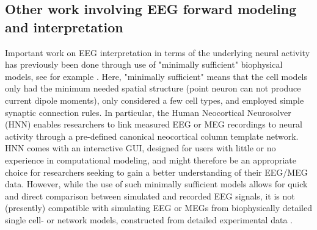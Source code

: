 \documentclass[preprint,10pt,authoryear]{elsarticle}
\newcommand{\gex}[1]{{\color{Orange}#1}}
\begin{document}

\gex{\subsection{Other work involving EEG forward modeling and interpretation}}
Important work on EEG interpretation in terms of the underlying neural activity has previously been done through use of "minimally sufficient" biophysical models, see for example \cite{Murakami2002, Murakami2003, Jones2007, Jones2009, Sliva2018, NEYMOTIN2020}. 
Here, "minimally sufficient" means that the cell models only had the minimum needed spatial structure (point neuron can not produce current dipole moments), only considered a few cell types, and employed simple synaptic connection rules.
In particular, the Human Neocortical Neurosolver (HNN) \citep{NEYMOTIN2020} enables researchers to link measured EEG or MEG recordings to neural activity through a pre-defined canonical neocortical column template network. 
HNN comes with an interactive GUI, designed for users with little or no experience in computational modeling, and might therefore be an appropriate choice for researchers seeking to gain a better understanding of their EEG/MEG data.  
However, while the use of such minimally sufficient models allows for quick and direct comparison between simulated and recorded EEG signals, it is not (presently) compatible with simulating EEG or MEGs from biophysically detailed single cell- or network models, constructed from detailed experimental data \citep{Reimann2013, Egger2014, MARKRAM2015, HAGEN2016, Gratiy2018, Arkhipov2018, BILLEH2019}.  

\end{document}
